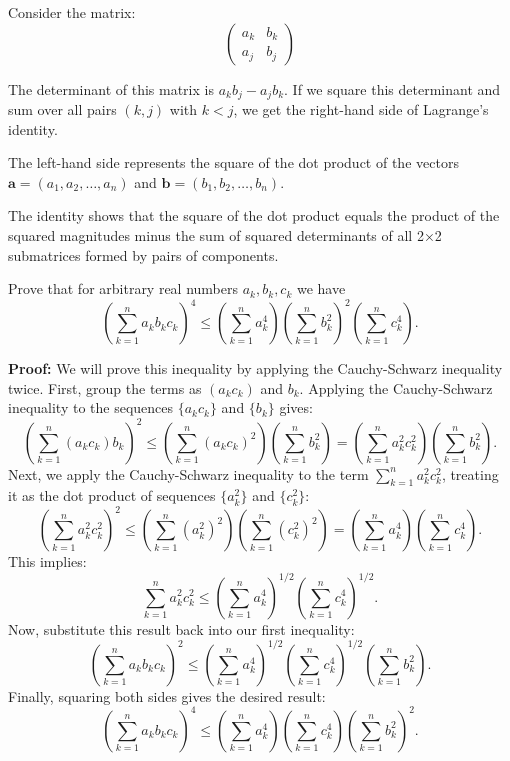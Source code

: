 Consider the matrix:
\[
\begin{pmatrix}
a_k & b_k \\
a_j & b_j
\end{pmatrix}
\]

The determinant of this matrix is $a_k b_j - a_j b_k$. If we square this determinant and sum over all pairs $(k,j)$ with $k < j$, we get the right-hand side of Lagrange's identity.

The left-hand side represents the square of the dot product of the vectors $\mathbf{a} = (a_1, a_2, \ldots, a_n)$ and $\mathbf{b} = (b_1, b_2, \ldots, b_n)$.

The identity shows that the square of the dot product equals the product of the squared magnitudes minus the sum of squared determinants of all 2×2 submatrices formed by pairs of components.

\begin{problembox}
Prove that for arbitrary real numbers \( a_k, b_k, c_k \) we have
\[
\left( \sum_{k=1}^n a_k b_k c_k \right)^4 \leq
\left( \sum_{k=1}^n a_k^4 \right)
\left( \sum_{k=1}^n b_k^2 \right)^2
\left( \sum_{k=1}^n c_k^4 \right).
\]
\end{problembox}

\textbf{Proof:}
We will prove this inequality by applying the Cauchy-Schwarz inequality twice.
First, group the terms as $(a_k c_k)$ and $b_k$. Applying the Cauchy-Schwarz inequality to the sequences $\{a_k c_k\}$ and $\{b_k\}$ gives:
\[
\left( \sum_{k=1}^n (a_k c_k) b_k \right)^2 \leq \left( \sum_{k=1}^n (a_k c_k)^2 \right) \left( \sum_{k=1}^n b_k^2 \right) = \left( \sum_{k=1}^n a_k^2 c_k^2 \right) \left( \sum_{k=1}^n b_k^2 \right).
\]
Next, we apply the Cauchy-Schwarz inequality to the term $\sum_{k=1}^n a_k^2 c_k^2$, treating it as the dot product of sequences $\{a_k^2\}$ and $\{c_k^2\}$:
\[
\left( \sum_{k=1}^n a_k^2 c_k^2 \right)^2 \leq \left( \sum_{k=1}^n (a_k^2)^2 \right) \left( \sum_{k=1}^n (c_k^2)^2 \right) = \left( \sum_{k=1}^n a_k^4 \right) \left( \sum_{k=1}^n c_k^4 \right).
\]
This implies:
\[
\sum_{k=1}^n a_k^2 c_k^2 \leq \left( \sum_{k=1}^n a_k^4 \right)^{1/2} \left( \sum_{k=1}^n c_k^4 \right)^{1/2}.
\]
Now, substitute this result back into our first inequality:
\[
\left( \sum_{k=1}^n a_k b_k c_k \right)^2 \leq \left( \sum_{k=1}^n a_k^4 \right)^{1/2} \left( \sum_{k=1}^n c_k^4 \right)^{1/2} \left( \sum_{k=1}^n b_k^2 \right).
\]
Finally, squaring both sides gives the desired result:
\[
\left( \sum_{k=1}^n a_k b_k c_k \right)^4 \leq \left( \sum_{k=1}^n a_k^4 \right) \left( \sum_{k=1}^n c_k^4 \right) \left( \sum_{k=1}^n b_k^2 \right)^2.
\]


